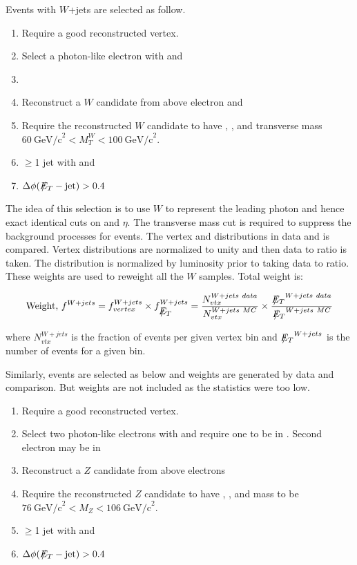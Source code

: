 \documentclass[11pt]{article}
\begin{document}
Events with $W$+jets are selected as follow.

\begin{enumerate}
 \item Require a good reconstructed vertex.
 \item Select a photon-like electron with  and 
 \item {}
 \item Reconstruct a $W$ candidate from above electron and \met
 \item Require the reconstructed $W$ candidate to have , , and transverse mass $60~\mathrm{GeV/c}^{2}<M_{T}^{W}<100~\mathrm{GeV/c}^{2}$.
 \item $\geq$1 jet with  and 
 \item $\Delta \phi(\met - \mathrm{jet})>0.4$
\end{enumerate}

The idea of this selection is to use $W$ to represent the leading photon and hence exact identical cuts on \pt and $\eta$. The transverse mass cut is required to suppress the background processes for \wjets events. The vertex and \met distributions in \wjets data and \MC is compared. Vertex distributions are normalized to unity and then data to \MC ratio is taken. The \met distribution is normalized by luminosity prior to taking data to \MC ratio. These weights are used to reweight all the $W$ \MC samples. Total weight is:

\begin{equation}
 \mathrm{Weight,}~f^{W+jets} = f_{vertex}^{W+jets} \times f_{\met}^{W+jets} = \frac{N^{W+jets~data}_{vtx}}{N^{W+jets~MC}_{vtx}} \times \frac{\met^{W+jets~data}}{\met^{W+jets~MC}}
 \label{eqa:WjetsWeights}
\end{equation}

\noindent where $N_{vtx}^{W+jets}$ is the fraction of events per given vertex bin and $\met^{W+jets}$ is the number of events for a given \met bin.

Similarly, \zjets events are selected as below and weights are generated by data and \MC comparison. But \met weights are not included as the statistics were too low.

\begin{enumerate}
 \item Require a good reconstructed vertex.
 \item Select two photon-like electrons with  and require one to be in . Second electron may be in 
 \item Reconstruct a $Z$ candidate from above electrons
 \item Require the reconstructed $Z$ candidate to have , , and mass to be $76~\mathrm{GeV/c}^{2}<M_{Z}<106~\mathrm{GeV/c}^{2}$.
 \item $\geq$1 jet with  and 
 \item $\Delta \phi(\met - \mathrm{jet})>0.4$
\end{enumerate}
\end{document}
